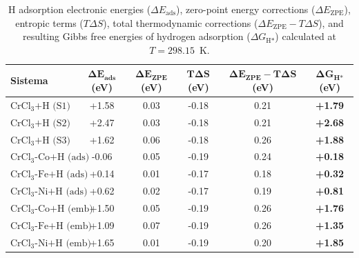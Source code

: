 \begin{table}[htbp]
  \centering
  \caption{H adsorption electronic energies ($\Delta E_{\text{ads}}$), zero-point energy corrections ($\Delta E_{\text{ZPE}}$), entropic terms ($T\Delta S$), total thermodynamic corrections ($\Delta E_{\text{ZPE}} - T\Delta S$), and resulting Gibbs free energies of hydrogen adsorption ($\Delta G_{\text{H*}}$) calculated at $T = 298.15$~K.}
  \label{tab:sistemas_termo}
  \vspace{0.3cm}
  \begin{tabular}{l c c c c c}
    \toprule
    \textbf{Sistema} & $\boldsymbol{\Delta E_{\text{ads}}}$ \textbf{(eV)} & $\boldsymbol{\Delta E_{\text{ZPE}}}$ \textbf{(eV)} & $\boldsymbol{T \Delta S}$ \textbf{(eV)} & $\boldsymbol{\Delta E_{\text{ZPE}} - T\Delta S}$ \textbf{(eV)} & $\boldsymbol{\Delta G_{\text{H*}}}$ \textbf{(eV)} \\
    \midrule
    $\text{CrCl}_3\text{+H (S1)}$           & +1.58 & 0.03 & -0.18 & 0.21 & \textbf{+1.79} \\
    $\text{CrCl}_3\text{+H (S2)}$           & +2.47 & 0.03 & -0.18 & 0.21 & \textbf{+2.68} \\
    $\text{CrCl}_3\text{+H (S3)}$           & +1.62 & 0.06 & -0.18 & 0.26 & \textbf{+1.88} \\
    $\text{CrCl}_3\text{-Co+H (ads)}$     & -0.06 & 0.05 & -0.19 & 0.24 & \textbf{+0.18} \\
    $\text{CrCl}_3\text{-Fe+H (ads)}$       & +0.14 & 0.01 & -0.17 & 0.18 & \textbf{+0.32} \\
    $\text{CrCl}_3\text{-Ni+H (ads)}$       & +0.62 & 0.02 & -0.17 & 0.19 & \textbf{+0.81} \\
    $\text{CrCl}_3\text{-Co+H (emb)}$       & +1.50 & 0.05 & -0.19 & 0.26 & \textbf{+1.76} \\
    $\text{CrCl}_3\text{-Fe+H (emb)}$       & +1.09 & 0.07 & -0.19 & 0.26 & \textbf{+1.35} \\
    $\text{CrCl}_3\text{-Ni+H (emb)}$       & +1.65 & 0.01 & -0.19 & 0.20 & \textbf{+1.85} \\
    \bottomrule
  \end{tabular}
\end{table}
